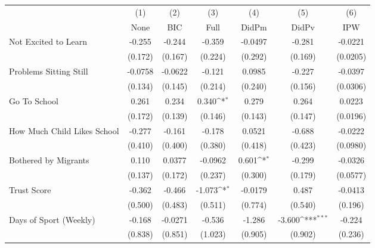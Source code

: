 {
\def\sym#1{\ifmmode^{#1}\else\(^{#1}\)\fi}
\begin{tabular}{l*{6}{c}}
\toprule
            &\multicolumn{1}{c}{(1)}&\multicolumn{1}{c}{(2)}&\multicolumn{1}{c}{(3)}&\multicolumn{1}{c}{(4)}&\multicolumn{1}{c}{(5)}&\multicolumn{1}{c}{(6)}\\
            &\multicolumn{1}{c}{None}&\multicolumn{1}{c}{BIC}&\multicolumn{1}{c}{Full}&\multicolumn{1}{c}{DidPm}&\multicolumn{1}{c}{DidPv}&\multicolumn{1}{c}{IPW}\\
\midrule
Not Excited to Learn&      -0.255         &      -0.244         &      -0.359         &     -0.0497         &      -0.281         &     -0.0221         \\
            &     (0.172)         &     (0.167)         &     (0.224)         &     (0.292)         &     (0.169)         &    (0.0205)         \\
\addlinespace
Problems Sitting Still&     -0.0758         &     -0.0622         &      -0.121         &      0.0985         &      -0.227         &     -0.0397         \\
            &     (0.134)         &     (0.145)         &     (0.214)         &     (0.240)         &     (0.156)         &    (0.0306)         \\
\addlinespace
Go To School&       0.261         &       0.234         &       0.340\sym{*}  &       0.279         &       0.264         &      0.0223         \\
            &     (0.172)         &     (0.139)         &     (0.146)         &     (0.143)         &     (0.147)         &    (0.0196)         \\
\addlinespace
How Much Child Likes School&      -0.277         &      -0.161         &      -0.178         &      0.0521         &      -0.688         &     -0.0222         \\
            &     (0.410)         &     (0.400)         &     (0.380)         &     (0.418)         &     (0.423)         &    (0.0980)         \\
\addlinespace
Bothered by Migrants&       0.110         &      0.0377         &     -0.0962         &       0.601\sym{*}  &      -0.299         &     -0.0326         \\
            &     (0.137)         &     (0.172)         &     (0.237)         &     (0.300)         &     (0.179)         &    (0.0577)         \\
\addlinespace
Trust Score &      -0.362         &      -0.466         &      -1.073\sym{*}  &     -0.0179         &       0.487         &     -0.0413         \\
            &     (0.500)         &     (0.483)         &     (0.511)         &     (0.774)         &     (0.540)         &     (0.196)         \\
\addlinespace
Days of Sport (Weekly)&      -0.168         &     -0.0271         &      -0.536         &      -1.286         &      -3.600\sym{***}&      -0.224         \\
            &     (0.838)         &     (0.851)         &     (1.023)         &     (0.905)         &     (0.902)         &     (0.236)         \\
\bottomrule
\end{tabular}
}
